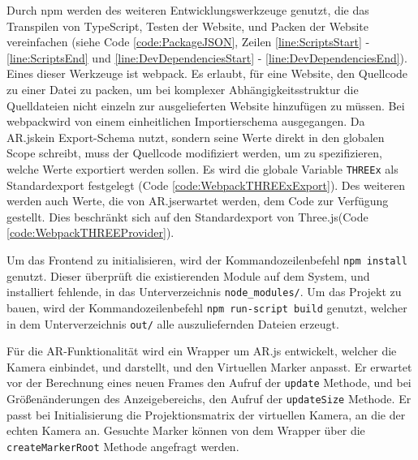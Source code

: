 Durch npm werden des weiteren Entwicklungswerkzeuge genutzt, die das
Transpilen von TypeScript, Testen der Website, und Packen der Website
vereinfachen (siehe Code \ref{code:PackageJSON}, Zeilen
\ref{line:ScriptsStart} - \ref{line:ScriptsEnd} und
\ref{line:DevDependenciesStart} - \ref{line:DevDependenciesEnd}).
Eines dieser Werkzeuge ist \grqq webpack\grqq . Es erlaubt, für eine
Website, den Quellcode zu einer Datei zu packen, um bei komplexer
Abhängigkeitsstruktur die Quelldateien nicht einzeln zur
ausgelieferten Website hinzufügen zu müssen.
Bei \grqq webpack\grqq\space wird von einem einheitlichen Importierschema
ausgegangen. Da \grqq AR.js\grqq\space kein Export-Schema nutzt, sondern
seine Werte direkt in den globalen Scope schreibt, muss der Quellcode
modifiziert werden, um zu spezifizieren, welche Werte exportiert werden
sollen. Es wird die globale Variable \texttt{THREEx} als Standardexport
festgelegt (Code \ref{code:WebpackTHREExExport}). Des weiteren werden
auch Werte, die von \grqq AR.js\grqq\space erwartet werden, dem Code
zur Verfügung gestellt. Dies beschränkt sich auf den Standardexport von
\grqq Three.js\grqq\space (Code \ref{code:WebpackTHREEProvider}).

\bigskip



\bigskip



Um das Frontend zu initialisieren, wird der Kommandozeilenbefehl
\texttt{npm install} genutzt. Dieser überprüft die existierenden
Module auf dem System, und installiert fehlende, in das
Unterverzeichnis \verb|node_modules/|.
Um das Projekt zu bauen, wird der Kommandozeilenbefehl
\texttt{npm run-script build} genutzt, welcher in dem Unterverzeichnis
\verb|out/| alle auszuliefernden Dateien erzeugt.

Für die AR-Funktionalität wird ein Wrapper um \grqq AR.js\grqq\space
entwickelt, welcher die Kamera einbindet, und darstellt, und den
Virtuellen Marker anpasst. Er erwartet vor der Berechnung eines
neuen Frames den Aufruf der \texttt{update} Methode, und bei
Größenänderungen des Anzeigebereichs, den Aufruf der \texttt{updateSize}
Methode. Er passt bei Initialisierung die Projektionsmatrix der
virtuellen Kamera, an die der echten Kamera an. Gesuchte Marker
können von dem Wrapper über die \texttt{createMarkerRoot} Methode
angefragt werden.

